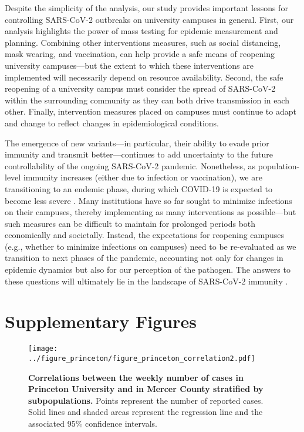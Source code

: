 \documentclass[12pt]{article}
\begin{document}
Despite the simplicity of the analysis, our study provides important lessons for controlling SARS-CoV-2 outbreaks on university campuses in general.
First, our analysis highlights the power of mass testing for epidemic measurement and planning.
Combining other interventions measures, such as social distancing, mask wearing, and vaccination, can help provide a safe means of reopening university campuses---but the extent to which these interventions are implemented will necessarily depend on resource availability.
Second, the safe reopening of a university campus must consider the spread of SARS-CoV-2 within the surrounding community as they can both drive transmission in each other.
Finally, intervention measures placed on campuses must continue to adapt and change to reflect changes in epidemiological conditions.

The emergence of new variants---in particular, their ability to evade prior immunity and transmit better---continues to add uncertainty to the future controllability of the ongoing SARS-CoV-2 pandemic.
Nonetheless, as population-level immunity increases (either due to infection or vaccination), we are transitioning to an endemic phase, during which COVID-19 is expected to become less severe \citep{lavine2021immunological}.
Many institutions have so far sought to minimize infections on their campuses, thereby implementing as many interventions as possible---but such measures can be difficult to maintain for prolonged periods both economically and societally.
Instead, the expectations for reopening campuses (e.g., whether to minimize infections on campuses) need to be re-evaluated as we transition to next phases of the pandemic, accounting not only for changes in epidemic dynamics but also for our perception of the pathogen.
The answers to these questions will ultimately lie in the landscape of SARS-CoV-2 immunity \citep{saad2020immune,baker2021limits}.



\pagebreak

\section*{Supplementary Figures}

\renewcommand{\thefigure}{S\arabic{figure}}
\setcounter{figure}{0}

\begin{figure}[!htp]
\texttt{[image: ../figure\_princeton/figure\_princeton\_correlation2.pdf]}
\caption{
\textbf{Correlations between the weekly number of cases in Princeton University and in Mercer County stratified by subpopulations.}
Points represent the number of reported cases.
Solid lines and shaded areas represent the regression line and the associated 95\% confidence intervals.
}
\end{figure}
\end{document}
